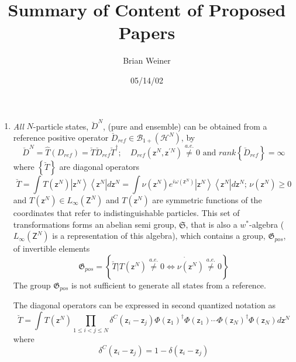 \documentclass[aps,preprint]{revtex4}%
\begin{document}
\preprint{ }
\title[Summary]{Summary of Content of Proposed Papers}
\author{Brian Weiner}
\affiliation{}
\keywords{}
\date{05/14/02}
\received{}

\maketitle
\tableofcontents


\begin{enumerate}
\item \emph{All} $N$-particle states, $\breve{D}^{N}$, (pure and ensemble) can
be obtained from a reference positive operator $\breve{D}_{ref}\in
\mathcal{B}_{1+}\left(  \mathcal{H}^{N}\right)  $, by
\begin{equation}
\breve{D}^{N}=\hat{T}\left(  D_{ref}\right)  =\breve{T}\breve{D}_{ref}%
\breve{T}^{\dagger};\quad D_{ref}\left(  \mathsf{z}^{N},\mathsf{z}^{\prime
N}\right)  \overset{a.e.}{\neq}0\text{ and }rank\left\{  \breve{D}%
_{ref}\right\}  =\infty
\end{equation}
where $\left\{  \breve{T}\right\}  $ are diagonal operators
\begin{equation}
\breve{T}=\int T\left(  \mathsf{z}^{N}\right)  \left\vert \mathsf{z}%
^{N}\right\rangle \left\langle \mathsf{z}^{N}\right\vert d\mathsf{z}^{N}%
=\int\nu\left(  \mathsf{z}^{N}\right)  e^{i\omega\left(  \mathsf{z}%
^{N}\right)  }\left\vert \mathsf{z}^{N}\right\rangle \left\langle
\mathsf{z}^{N}\right\vert d\mathsf{z}^{N};\,\nu\left(  \mathsf{z}^{N}\right)
\geq0
\end{equation}
and $T\left(  \mathsf{z}^{N}\right)  \in L_{\infty}\left(  \mathsf{Z}%
^{N}\right)  $ and $T\left(  \mathsf{z}^{N}\right)  $ are symmetric functions
of the coordinates that refer to indistinguishable particles. This set of
transformations forms an abelian semi group, $\mathfrak{S}$, that is also a
$w^{\ast}$-algebra ($L_{\infty}\left(  \mathsf{Z}^{N}\right)  $ is a
representation of this algebra), which contains a group, $\mathfrak{G}_{pos}$,
of invertible elements
\begin{equation}
\mathfrak{G}_{pos}=\left\{  \breve{T}|T\left(  \mathsf{z}^{N}\right)
\overset{.}{\overset{a.e.}{\neq}0\Leftrightarrow\nu\left(  \mathsf{z}%
^{N}\right)  \overset{a.e.}{\neq}0}\right\}
\end{equation}
The group $\mathfrak{G}_{pos}$ is not sufficient to generate all states from a reference.

The diagonal operators can be expressed in second quantized notation as
\begin{equation}
\breve{T}=\int T\left(  \mathsf{z}^{N}\right)  \prod_{1\leq i<j\leq N}%
\delta^{C}\left(  \mathsf{z}_{i}-\mathsf{z}_{j}\right)  \Phi\left(
\mathsf{z}_{1}\right)  ^{\dagger}\Phi\left(  \mathsf{z}_{1}\right)  \cdots
\Phi\left(  \mathsf{z}_{N}\right)  ^{\dagger}\Phi\left(  \mathsf{z}%
_{N}\right)  d\mathsf{z}^{N}%
\end{equation}
where
\begin{equation}
\delta^{C}\left(  \mathsf{z}_{i}-\mathsf{z}_{j}\right)  =1-\delta\left(
\mathsf{z}_{i}-\mathsf{z}_{j}\right)
\end{equation}



\end{enumerate}
\end{document}
